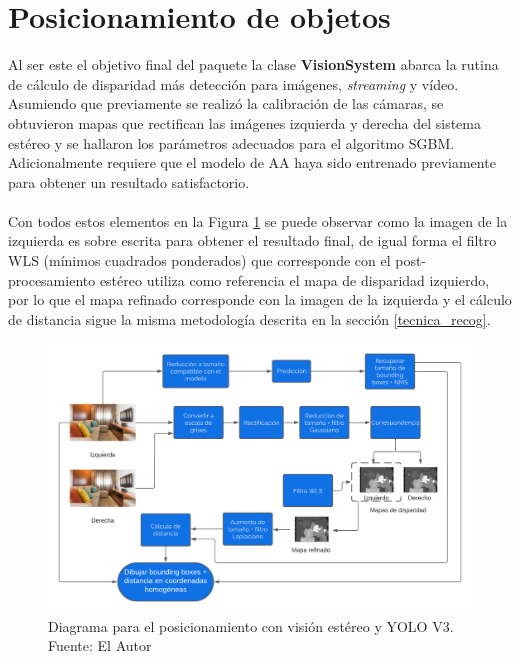 \section{Posicionamiento de objetos}
Al ser este el objetivo final del paquete la clase \textbf{VisionSystem} abarca la rutina de cálculo de disparidad más detección para imágenes, \textit{streaming} y vídeo. Asumiendo que previamente se realizó la calibración de las cámaras, se obtuvieron mapas que rectifican las imágenes izquierda y derecha del sistema estéreo y se hallaron los parámetros adecuados para el algoritmo SGBM. Adicionalmente requiere que el modelo de AA haya sido entrenado previamente para obtener un resultado satisfactorio.
\\
\\
Con todos estos elementos en la Figura \ref{vision_system_cycle} se puede observar como la imagen de la izquierda es sobre escrita para obtener el resultado final, de igual forma el filtro WLS (mínimos cuadrados ponderados) que corresponde con el post-procesamiento estéreo utiliza como referencia el mapa de disparidad izquierdo, por lo que el mapa refinado corresponde con la imagen de la izquierda y el cálculo de distancia sigue la misma metodología descrita en la sección \ref{tecnica_recog}.
\begin{figure}[H]
    \centering
    \includegraphics[scale=0.6]{Recursos/vision_system_cycle.png}
    \caption[Diagrama para el posicionamiento con visión estéreo y YOLO V3.]{Diagrama para el posicionamiento con visión estéreo y YOLO V3. {\footnotesize Fuente: El Autor}}
    \label{vision_system_cycle}
\end{figure}